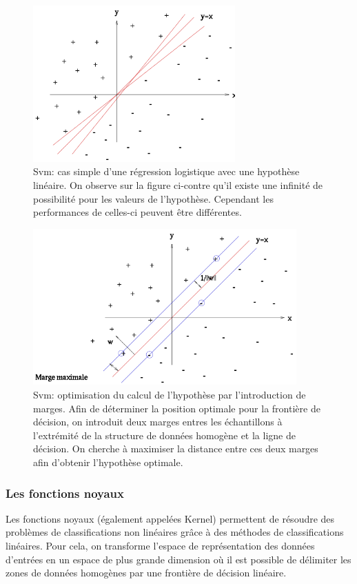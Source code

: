 \begin{figure}[h]
	\centering\includegraphics[height=6cm]{images/svm_no_margin.png}
	\caption[Svm: cas simple d'une régression logistique avec une hypothèse linéaire]{Svm: cas simple d'une régression logistique avec une hypothèse linéaire. On observe sur la figure ci-contre qu'il existe une infinité de possibilité pour les valeurs de l'hypothèse. Cependant les performances de celles-ci peuvent être différentes.}
	\label{fig:Svm: cas simple d'une regression logistique avec une hypothèse linéaire}
\end{figure}

\begin{figure}[h]
	\centering\includegraphics[height=6cm]{images/svm_margin.png}
	\caption[SVM: optimisation du calcul de l'hypothèse par l'introduction de marges]{Svm: optimisation du calcul de l'hypothèse par l'introduction de marges. Afin de déterminer la position optimale pour la frontière de décision, on introduit deux marges entres les échantillons à l'extrémité de la structure de données homogène et la ligne de décision. On cherche à maximiser la distance entre ces deux marges afin d'obtenir l'hypothèse optimale.}
	\label{fig:Svm: optimisation du calcul de l'hypothèse par l'introduction de marges}
\end{figure}

\subsubsection{Les fonctions noyaux}
\label{Le Machine Learning: Les différents algorithmes: SVM: les fonctions noyaux}
Les fonctions noyaux (également appelées Kernel) permettent de résoudre des problèmes de classifications non linéaires grâce à des méthodes de classifications linéaires. Pour cela, on transforme l'espace de représentation des données d'entrées en un espace de plus grande dimension où il est possible de délimiter les zones de données homogènes par une frontière de décision linéaire.


